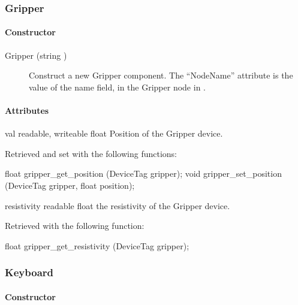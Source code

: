 \subsubsection{Gripper}

\paragraph{Constructor}

\noindent
\begin{description}
\item[{Gripper (string )}] Construct a new Gripper
  component. The ``NodeName'' attribute is the value of the name
  field, in the Gripper node in \webots.

\end{description}

\paragraph{Attributes}

\noindent
\begin{itemize}
\begin{attribute}{val}
  {readable, writeable}
  {float}
  {}
  Position of the Gripper device.

  Retrieved and set with the following \webots functions:

\begin{cxx}
float gripper_get_position  (DeviceTag gripper);
void gripper_set_position  (DeviceTag gripper, float position);
\end{cxx}
\end{attribute}

\begin{attribute}{resistivity}
  {readable}
  {float}
  {}
  the resistivity of the Gripper device.

  Retrieved with the following \webots function:

\begin{cxx}
float gripper_get_resistivity  (DeviceTag gripper);
\end{cxx}
\end{attribute}

\end{itemize}

\subsubsection{Keyboard}

\paragraph{Constructor}


